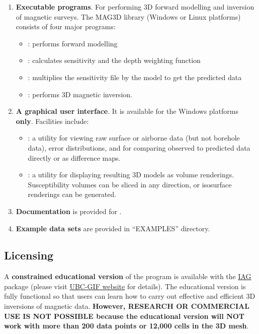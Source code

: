 \begin{enumerate}
\item \textbf{Executable programs}. For performing 3D forward modelling and inversion of magnetic surveys. The MAG3D library (Windows or Linux platforms) consists of four major programs: \begin{itemize}
\item {}: performs forward modelling
\item {}: calculates sensitivity and the depth weighting function
\item {}: multiplies the sensitivity file by the model to get the predicted data
\item {}: performs 3D magnetic inversion.
\end{itemize}

\item \textbf{A graphical user interface}. It is available for the Windows platforms \textbf{only}. Facilities include:
\begin{itemize}
\item {}: a utility for viewing raw surface or airborne data (but not borehole data), error distributions, and for comparing observed to predicted data directly or as difference maps.
\item {}: a utility for displaying resulting 3D models as volume renderings. Susceptibility volumes can be sliced in any direction, or isosurface renderings can be generated.
\end{itemize}

\item \textbf{Documentation} is provided for \prog.

\item \textbf{Example data sets} are provided in ``EXAMPLES'' directory.
\end{enumerate}

\subsection{Licensing}

A \textbf{constrained educational version} of the program is available with the \href{http://www.flintbox.com/public/project/1605/}{IAG} package (please visit \href{http://gif.eos.ubc.ca}{UBC-GIF website} for details). The educational version is fully functional so that users can learn how to carry out effective and efficient 3D inversions of magnetic data. \textbf{However, RESEARCH OR COMMERCIAL USE IS NOT POSSIBLE because the educational version will NOT work with more than 200 data points or 12,000 cells in the 3D mesh}.

